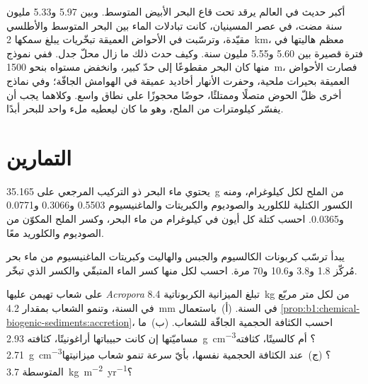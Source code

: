 أكبر  حديث في العالم يرقد تحت قاع البحر الأبيض المتوسط. وبين \num{5.97} و\num{5.33} مليون سنة مضت، في عصر المسينيان، كانت تبادلات الماء بين البحر المتوسط والأطلسي مقيّدة، وترسّبت في الأحواض العميقة تبخّريات يبلغ سمكها \qty{2}{km}، معظم هاليتها في فترة قصيرة بين \num{5.60} و\num{5.55} مليون سنة. وكيف حدث ذلك ما زال محلّ جدل. ففي نموذج منها كان البحر مقطوعًا إلى حدّ كبير، وانخفض مستواه بنحو \qty{1500}{m}، فصارت الأحواض العميقة بحيرات ملحية، وحفرت الأنهار أخاديد عميقة في الهوامش الجافّة؛ وفي نماذج أخرى ظلّ الحوض متصلًا وممتلئًا، حوضًا محجوزًا على نطاق واسع. وكلاهما يجب أن يفسّر كيلومترات من الملح، وهو ما كان ليعطيه ملء واحد للبحر أبدًا.

\section{التمارين}

\begin{exercise}[$\star$]\label{exo:b1:chemical-biogenic-sediments:1}
يحتوي ماء البحر ذو التركيب المرجعي على \qty{35.165}{g} من الملح لكل كيلوغرام، ومنه الكسور الكتلية للكلوريد والصوديوم والكبريتات والماغنيسيوم \num{0.5503} و\num{0.3066} و\num{0.0771} و\num{0.0365}. احسب كتلة كل أيون في كيلوغرام من ماء البحر، وكسر الملح المكوّن من الصوديوم والكلوريد معًا.
\end{exercise}

\begin{exercise}[$\star$]\label{exo:b1:chemical-biogenic-sediments:2}
يبدأ ترسّب كربونات الكالسيوم والجبس والهاليت وكبريتات الماغنيسيوم من ماء بحر مُركّز \num{1.8} و\num{3.8} و\num{10.6} و\num{70} مرة. احسب لكل منها كسر الماء المتبقّي والكسر الذي تبخّر.
\end{exercise}

\begin{exercise}[$\star$]\label{exo:b1:chemical-biogenic-sediments:3}
على شعاب تهيمن عليها \emph{Acropora} تبلغ الميزانية الكربوناتية \qty{8.4}{kg} من  لكل متر مربّع في السنة، وتنمو الشعاب بمقدار \qty{4.2}{mm} في السنة. (أ)~باستعمال \cref{prop:b1:chemical-biogenic-sediments:accretion}، احسب الكثافة الحجمية الجافّة للشعاب. (ب)~ما مساميّتها إن كانت حبيباتها أراغونيتًا، كثافته \qty{2.93}{g.cm^{-3}}؟ أم كالسيتًا، كثافته \qty{2.71}{g.cm^{-3}}؟ (ج)~عند الكثافة الحجمية نفسها، بأيّ سرعة تنمو شعاب ميزانيتها المتوسطة \qty{3.7}{kg.m^{-2}.yr^{-1}}؟
\end{exercise}

